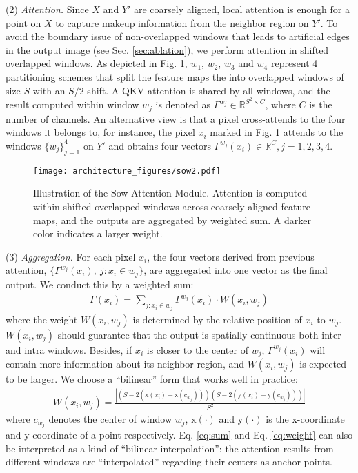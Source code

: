 (2) \textit{Attention.} Since $X$ and $Y'$ are coarsely aligned, local attention is enough for a point on $X$ to capture makeup information from the neighbor region on $Y'$. To avoid the boundary issue of non-overlapped windows that leads to artificial edges in the output image (see Sec. \ref{sec:ablation}), we perform attention in shifted overlapped windows. As depicted in Fig. \ref{fig:sow}, $w_1$, $w_2$, $w_3$ and $w_4$ represent 4 partitioning schemes that split the feature maps the into overlapped windows of size $S$ with an $S/2$ shift. A QKV-attention is shared by all windows, and the result computed within window $w_j$ is denoted as $\Gamma^{w_j}\in\mathbb{R}^{S^2\times C}$, where $C$ is the number of channels. An alternative view is that a pixel cross-attends to the four windows it belongs to, for instance, the pixel $x_i$ marked in Fig. \ref{fig:sow} attends to the windows $\{w_j\}_{j=1}^4$ on $Y'$ and obtains four vectors $\Gamma^{w_j}(x_i)\in \mathbb{R}^{C},j=1,2,3,4$.

\begin{figure}[t]
    \setlength{\belowcaptionskip}{-0.1cm}
    \centering
    \texttt{[image: architecture\_figures/sow2.pdf]}
\caption{Illustration of the Sow-Attention Module. Attention is computed within shifted overlapped windows across coarsely aligned feature maps, and the outputs are aggregated by weighted sum. A darker color indicates a larger weight.}
\label{fig:sow}
\end{figure}
(3) \textit{Aggregation.} For each pixel $x_i$, the four vectors derived from previous attention, $\{\Gamma^{w_j}(x_i),\ j:x_i\in w_j\}$, are aggregated into one vector as the final output. We conduct this by a weighted sum:
\begin{equation}
\begin{aligned}
\Gamma(x_i)=\sum_{j:x_i\in w_j}\Gamma^{w_j}(x_i)\cdot W(x_i,w_j)
\end{aligned}
\label{eq:sum}
\end{equation}
where the weight $W(x_i,w_j)$ is determined by the relative position of $x_i$ to $w_j$. $W(x_i,w_j)$ should guarantee that the output is spatially continuous both inter and intra windows. Besides, if $x_i$ is closer to the center of $w_j$, $\Gamma^{w_j}(x_i)$ will contain more information about its neighbor region, and $W(x_i,w_j)$ is expected to be larger. We choose a ``bilinear'' form that works well in practice:
\begin{equation}
\begin{aligned}
    W(x_i,w_j)=\frac{\left|\left(S-2\left(\mathrm{x}(x_i)-\mathrm{x}(c_{w_j})\right)\right)\left(S-2\left(\mathrm{y}(x_i)-\mathrm{y}(c_{w_j})\right)\right)\right|}{S^2}
\end{aligned}
\label{eq:weight}
\end{equation}
where $c_{w_j}$ denotes the center of window $w_j$, $\mathrm{x}(\cdot)$ and $\mathrm{y}(\cdot)$ is the x-coordinate and y-coordinate of a point respectively. Eq. \ref{eq:sum} and Eq. \ref{eq:weight} can also be interpreted as a kind of ``bilinear interpolation'': the attention results from different windows are ``interpolated'' regarding their centers as anchor points. 

